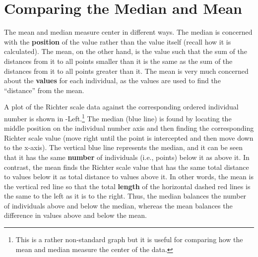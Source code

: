 \section{Comparing the Median and Mean} \label{sect:MeanMedian}
The mean and median measure center in different ways.  The median is concerned with the \textbf{position} of the value rather than the value itself (recall how it is calculated). The mean, on the other hand, is the value such that the sum of the distances from it to all points smaller than it is the same as the sum of the distances from it to all points greater than it. The mean is very much concerned about the \textbf{values} for each individual, as the values are used to find the ``distance'' from the mean.


A plot of the Richter scale data against the corresponding ordered individual number is shown in -Left.\footnote{This is a rather non-standard graph but it is useful for comparing how the mean and median measure the center of the data.}  The median (blue line) is found by locating the middle position on the individual number axis and then finding the corresponding Richter scale value (move right until the point is intercepted and then move down to the x-axis). The vertical blue line represents the median, and it can be seen that it has the same \textbf{number} of individuals (i.e., points) below it as above it. In contrast, the mean finds the Richter scale value that has the same total distance to values below it as total distance to values above it. In other words, the mean is the vertical red line so that the total \textbf{length} of the horizontal dashed red lines is the same to the left as it is to the right. Thus, the median balances the number of individuals above and below the median, whereas the mean balances the difference in values above and below the mean.

